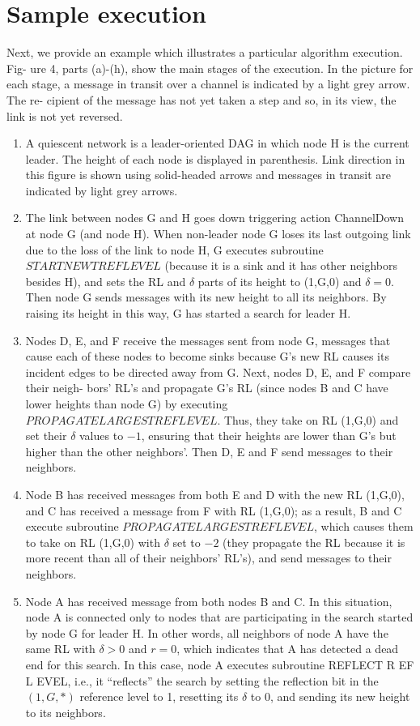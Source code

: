 \section{Sample execution}
Next, we provide an example which illustrates a particular algorithm execution. Fig- ure 4, parts (a)-(h), show the main stages of the execution. In the picture for each stage, a message in transit over a channel is indicated by a light grey arrow. The re- cipient of the message has not yet taken a step and so, in its view, the link is not yet reversed.
\begin{enumerate}[label=\alph*)]
	\item A quiescent network is a leader-oriented DAG in which node H is the current leader. The height of each node is displayed in parenthesis. Link direction in this figure is shown using solid-headed arrows and messages in transit are indicated by light grey arrows.
	\item The link between nodes G and H goes down triggering action ChannelDown at node G (and node H). When non-leader node G loses its last outgoing link due to the loss of the link to node H, G executes subroutine $STARTNEWTREFLEVEL$ (because it is a sink and it has other neighbors besides H), and sets the RL and $\delta$ parts of its height to (1,G,0) and $\delta = 0$. Then node G sends messages with its new height to all its neighbors. By raising its height in this way, G has started a search for leader H.
	\item Nodes D, E, and F receive the messages sent from node G, messages that cause each of these nodes to become sinks because G’s new RL causes its incident edges to be directed away from G. Next, nodes D, E, and F compare their neigh- bors’ RL’s and propagate G’s RL (since nodes B and C have lower heights than node G) by executing $PROPAGATELARGESTREFLEVEL$. Thus, they take on RL (1,G,0) and set their $\delta$ values to $-1$, ensuring that their heights are lower than G’s but higher than the other neighbors’. Then D, E and F send messages to their neighbors.
	\item Node B has received messages from both E and D with the new RL (1,G,0), and C has received a message from F with RL (1,G,0); as a result, B and C execute subroutine $PROPAGATELARGESTREFLEVEL$, which causes them to take on RL (1,G,0) with $\delta$ set to $-2$ (they propagate the RL because it is more recent than all of their neighbors’ RL’s), and send messages to their neighbors.
	\item Node A has received message from both nodes B and C. In this situation, node A is connected only to nodes that are participating in the search started by node G for leader H. In other words, all neighbors of node A have the same RL with $\delta > 0$ and $r = 0$, which indicates that A has detected a dead end for this search. In this case, node A executes subroutine REFLECT R EF L EVEL, i.e., it “reflects” the search by setting the reflection bit in the $(1,G,*)$ reference level to 1, resetting its $\delta$ to 0, and sending its new height to its neighbors.

\end{enumerate}
